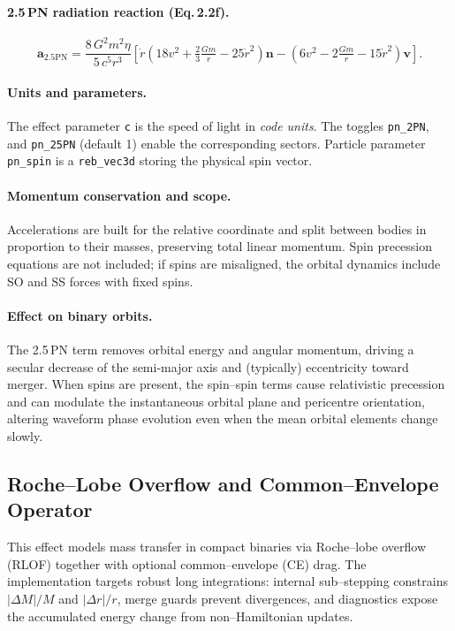 \documentclass[11pt]{article}
\begin{document}
\paragraph{2.5\,PN radiation reaction (Eq.\,2.2f).}
\[
\mathbf{a}_{2.5\mathrm{PN}}
= \frac{8\,G^2 m^2 \eta}{5\,c^5 r^3}
\left[
  \dot r\left(18v^2+\tfrac{2}{3}\tfrac{Gm}{r}-25\dot r^2\right)\mathbf{n}
 -\left(6v^2-2\tfrac{Gm}{r}-15\dot r^2\right)\mathbf{v}
\right].
\]

\paragraph{Units and parameters.}
The effect parameter \texttt{c} is the speed of light in \emph{code units}.
The toggles \texttt{pn\_2PN}, and \texttt{pn\_25PN}
(default 1) enable the corresponding sectors. Particle parameter
\texttt{pn\_spin} is a \texttt{reb\_vec3d} storing the physical spin vector.

\paragraph{Momentum conservation and scope.}
Accelerations are built for the relative coordinate and split between bodies
in proportion to their masses, preserving total linear momentum.
Spin precession equations are not included; if spins are misaligned, the
orbital dynamics include SO and SS forces with fixed spins.

\paragraph{Effect on binary orbits.}
The 2.5\,PN term removes orbital energy and angular momentum, driving a secular
decrease of the semi-major axis and (typically) eccentricity toward merger.
When spins are present, the spin–spin terms cause relativistic
precession and can modulate the instantaneous orbital plane and pericentre
orientation, altering waveform phase evolution even when the mean orbital
elements change slowly.



\subsection{Roche–Lobe Overflow and Common–Envelope Operator}
\label{sec:RLOF}

This effect models mass transfer in compact binaries via Roche–lobe overflow
(RLOF) together with optional common–envelope (CE) drag. The implementation
targets robust long integrations: internal sub–stepping constrains
$|\Delta M|/M$ and $|\Delta r|/r$, merge guards prevent divergences, and
diagnostics expose the accumulated energy change from non–Hamiltonian updates.
\end{document}
